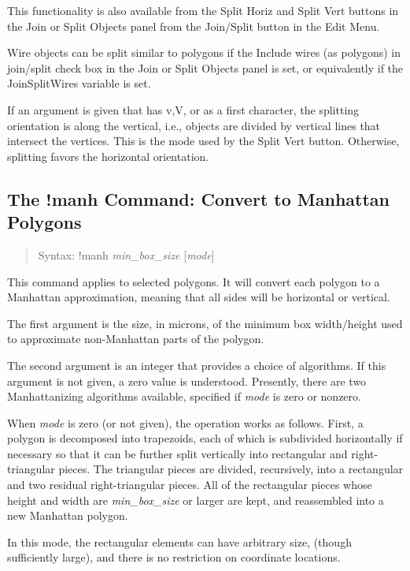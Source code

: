 This functionality is also available from the {\cb Split Horiz} and
{\cb Split Vert} buttons in the {\cb Join or Split Objects} panel from
the {\cb Join/Split} button in the {\cb Edit Menu}.

Wire objects can be split similar to polygons if the {\cb Include
wires (as polygons) in join/split} check box in the {\cb Join or Split
Objects} panel is set, or equivalently if the {\et JoinSplitWires}
variable is set.

If an argument is given that has {\vt v},{\vt V}, or {} as a
first character, the splitting orientation is along the vertical,
i.e., objects are divided by vertical lines that intersect the
vertices.  This is the mode used by the {\cb Split Vert} button. 
Otherwise, splitting favors the horizontal orientation.


\subsection{The {\cb !manh} Command: Convert to Manhattan Polygons}
\begin{quote}
Syntax: {\vt !manh} {\it min\_box\_size} [{\it mode\/}]
\end{quote}
This command applies to selected polygons.  It will convert each
polygon to a Manhattan approximation, meaning that all sides will be
horizontal or vertical.

The first argument is the size, in microns, of the minimum box
width/height used to approximate non-Manhattan parts of the polygon.

The second argument is an integer that provides a choice of
algorithms.  If this argument is not given, a zero value is
understood.  Presently, there are two Manhattanizing algorithms
available, specified if {\it mode} is zero or nonzero.

When {\it mode} is zero (or not given), the operation works as
follows.  First, a polygon is decomposed into trapezoids, each of
which is subdivided horizontally if necessary so that it can be
further split vertically into rectangular and right-triangular pieces. 
The triangular pieces are divided, recursively, into a rectangular and
two residual right-triangular pieces.  All of the rectangular pieces
whose height and width are {\it min\_box\_size} or larger are kept,
and reassembled into a new Manhattan polygon.

In this mode, the rectangular elements can have arbitrary size,
(though sufficiently large), and there is no restriction on coordinate
locations.

